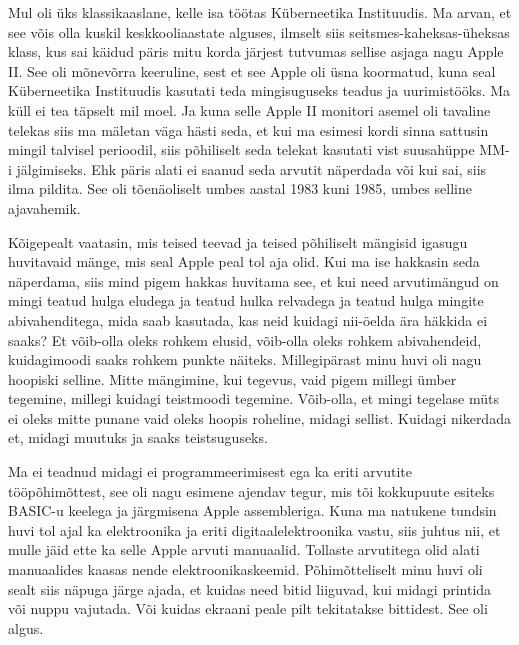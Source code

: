 

Mul oli üks klassikaaslane, kelle isa töötas Küberneetika 
Instituudis. Ma arvan, et see võis olla kuskil 
keskkooliaastate alguses, ilmselt siis seitsmes-kaheksas-üheksas klass, kus sai 
käidud päris mitu korda järjest tutvumas sellise asjaga nagu Apple 
II. See oli  mõnevõrra keeruline, sest et see Apple oli 
üsna koormatud, kuna seal Küberneetika Instituudis  kasutati teda mingisuguseks 
teadus ja uurimistööks. Ma küll ei tea täpselt mil moel. Ja kuna selle Apple II 
monitori asemel oli tavaline telekas siis ma mäletan väga hästi seda, et kui ma 
esimesi kordi sinna sattusin mingil talvisel perioodil, siis põhiliselt seda 
telekat kasutati vist suusahüppe MM-i jälgimiseks. Ehk päris alati ei saanud 
seda arvutit näperdada või kui sai, siis ilma pildita. See oli  tõenäoliselt 
umbes aastal 1983 kuni 1985, umbes selline ajavahemik. 


Kõigepealt vaatasin, mis teised teevad ja teised põhiliselt mängisid igasugu 
huvitavaid mänge, mis seal Apple peal tol aja olid. Kui ma ise hakkasin seda 
näperdama, siis mind pigem hakkas huvitama see, et kui need arvutimängud on 
mingi teatud hulga eludega ja teatud hulka relvadega ja teatud hulga mingite 
abivahenditega, mida saab kasutada, kas neid kuidagi nii-öelda ära häkkida ei 
saaks? Et võib-olla oleks rohkem elusid,  võib-olla oleks rohkem abivahendeid, 
kuidagimoodi saaks rohkem punkte näiteks. Millegipärast minu huvi oli nagu 
hoopiski selline. Mitte  mängimine, kui tegevus, vaid pigem millegi ümber 
tegemine, millegi kuidagi teistmoodi tegemine. Võib-olla, et mingi tegelase 
müts ei oleks mitte punane vaid oleks hoopis roheline, midagi sellist. Kuidagi  
nikerdada  et, midagi muutuks ja saaks teistsuguseks. 

Ma ei teadnud midagi ei programmeerimisest ega ka eriti arvutite 
tööpõhimõttest, see oli nagu esimene ajendav tegur, mis tõi kokkupuute esiteks 
BASIC-u keelega ja järgmisena Apple 
assembleriga. Kuna ma natukene tundsin huvi tol ajal ka 
elektroonika ja eriti digitaalelektroonika vastu, siis juhtus nii, et mulle 
jäid ette ka selle Apple arvuti manuaalid. Tollaste arvutitega olid alati 
manuaalides kaasas nende elektroonikaskeemid. Põhimõtteliselt minu huvi oli 
sealt siis  näpuga järge ajada,  et kuidas need bitid liiguvad, kui midagi 
printida või nuppu vajutada. Või kuidas ekraani peale pilt tekitatakse 
bittidest. See oli algus.

